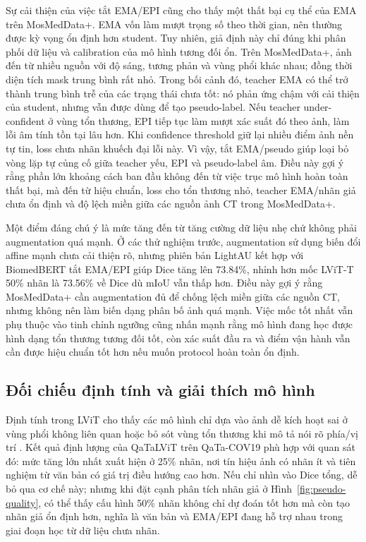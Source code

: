 Sự cải thiện của việc tắt EMA/EPI cũng cho thấy một thất bại cụ thể của EMA trên MosMedData+. EMA vốn làm mượt trọng số theo thời gian, nên thường được kỳ vọng ổn định hơn student. Tuy nhiên, giả định này chỉ đúng khi phân phối dữ liệu và calibration của mô hình tương đối ổn. Trên MosMedData+, ảnh đến từ nhiều nguồn với độ sáng, tương phản và vùng phổi khác nhau; đồng thời diện tích mask trung bình rất nhỏ. Trong bối cảnh đó, teacher EMA có thể trở thành trung bình trễ của các trạng thái chưa tốt: nó phản ứng chậm với cải thiện của student, nhưng vẫn được dùng để tạo pseudo-label. Nếu teacher under-confident ở vùng tổn thương, EPI tiếp tục làm mượt xác suất đó theo ảnh, làm lỗi âm tính tồn tại lâu hơn. Khi confidence threshold giữ lại nhiều điểm ảnh nền tự tin, loss chưa nhãn khuếch đại lỗi này. Vì vậy, tắt EMA/pseudo giúp loại bỏ vòng lặp tự củng cố giữa teacher yếu, EPI và pseudo-label âm. Điều này gợi ý rằng phần lớn khoảng cách ban đầu không đến từ việc trục mô hình hoàn toàn thất bại, mà đến từ hiệu chuẩn, loss cho tổn thương nhỏ, teacher EMA/nhãn giả chưa ổn định và độ lệch miền giữa các nguồn ảnh CT trong MosMedData+.

Một điểm đáng chú ý là mức tăng đến từ tăng cường dữ liệu nhẹ chứ không phải augmentation quá mạnh. Ở các thử nghiệm trước, augmentation sử dụng biến đổi affine mạnh chưa cải thiện rõ, nhưng phiên bản LightAU kết hợp với BiomedBERT tắt EMA/EPI giúp Dice tăng lên 73.84\%, nhỉnh hơn mốc LViT-T 50\% nhãn là 73.56\% về Dice dù mIoU vẫn thấp hơn. Điều này gợi ý rằng MosMedData+ cần augmentation đủ để chống lệch miền giữa các nguồn CT, nhưng không nên làm biến dạng phân bố ảnh quá mạnh. Việc mốc tốt nhất vẫn phụ thuộc vào tinh chỉnh ngưỡng cũng nhấn mạnh rằng mô hình đang học được hình dạng tổn thương tương đối tốt, còn xác suất đầu ra và điểm vận hành vẫn cần được hiệu chuẩn tốt hơn nếu muốn protocol hoàn toàn ổn định.

\subsection{Đối chiếu định tính và giải thích mô hình}
\label{sec:qualitative-interpretability}

Định tính trong LViT cho thấy các mô hình chỉ dựa vào ảnh dễ kích hoạt sai ở vùng phổi không liên quan hoặc bỏ sót vùng tổn thương khi mô tả nói rõ phía/vị trí \cite{li2023lvit}. Kết quả định lượng của QaTaLViT trên QaTa-COV19 phù hợp với quan sát đó: mức tăng lớn nhất xuất hiện ở 25\% nhãn, nơi tín hiệu ảnh có nhãn ít và tiên nghiệm từ văn bản có giá trị điều hướng cao hơn. Nếu chỉ nhìn vào Dice tổng, dễ bỏ qua cơ chế này; nhưng khi đặt cạnh phân tích nhãn giả ở Hình~\ref{fig:pseudo-quality}, có thể thấy cấu hình 50\% nhãn không chỉ dự đoán tốt hơn mà còn tạo nhãn giả ổn định hơn, nghĩa là văn bản và EMA/EPI đang hỗ trợ nhau trong giai đoạn học từ dữ liệu chưa nhãn.

